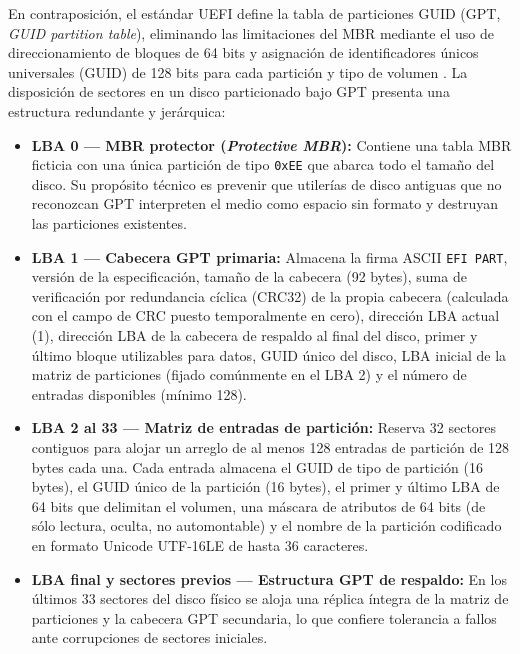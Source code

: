\documentclass[12pt]{article}
\begin{document}
En contraposición, el estándar UEFI define la tabla de particiones GUID (GPT, \textit{GUID partition table}), eliminando las limitaciones del MBR mediante el uso de direccionamiento de bloques de 64 bits y asignación de identificadores únicos universales (GUID) de 128 bits para cada partición y tipo de volumen \parencite{uefi2024specification}. La disposición de sectores en un disco particionado bajo GPT presenta una estructura redundante y jerárquica:
\begin{itemize}[noitemsep, topsep=2pt]
    \item \textbf{LBA 0 — MBR protector (\textit{Protective MBR}):} Contiene una tabla MBR ficticia con una única partición de tipo \texttt{0xEE} que abarca todo el tamaño del disco. Su propósito técnico es prevenir que utilerías de disco antiguas que no reconozcan GPT interpreten el medio como espacio sin formato y destruyan las particiones existentes.
    \item \textbf{LBA 1 — Cabecera GPT primaria:} Almacena la firma ASCII \texttt{EFI PART}, versión de la especificación, tamaño de la cabecera (92 bytes), suma de verificación por redundancia cíclica (CRC32) de la propia cabecera (calculada con el campo de CRC puesto temporalmente en cero), dirección LBA actual (1), dirección LBA de la cabecera de respaldo al final del disco, primer y último bloque utilizables para datos, GUID único del disco, LBA inicial de la matriz de particiones (fijado comúnmente en el LBA 2) y el número de entradas disponibles (mínimo 128).
    \item \textbf{LBA 2 al 33 — Matriz de entradas de partición:} Reserva 32 sectores contiguos para alojar un arreglo de al menos 128 entradas de partición de 128 bytes cada una. Cada entrada almacena el GUID de tipo de partición (16 bytes), el GUID único de la partición (16 bytes), el primer y último LBA de 64 bits que delimitan el volumen, una máscara de atributos de 64 bits (de sólo lectura, oculta, no automontable) y el nombre de la partición codificado en formato Unicode UTF-16LE de hasta 36 caracteres.
    \item \textbf{LBA final y sectores previos — Estructura GPT de respaldo:} En los últimos 33 sectores del disco físico se aloja una réplica íntegra de la matriz de particiones y la cabecera GPT secundaria, lo que confiere tolerancia a fallos ante corrupciones de sectores iniciales.
\end{itemize}
\end{document}
